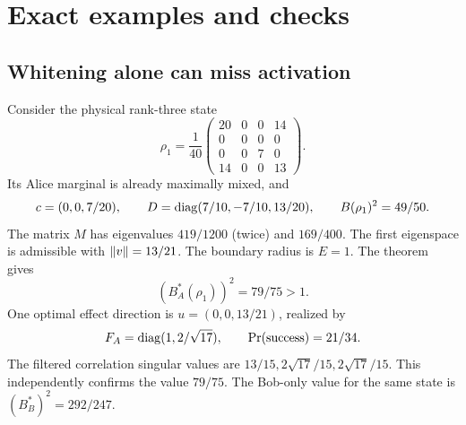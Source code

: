 \section{Exact examples and checks}

\subsection{Whitening alone can miss activation}
Consider the physical rank-three state
\begin{equation}
 \rho_1=\frac1{40}\begin{pmatrix}
 20&0&0&14\\0&0&0&0\\0&0&7&0\\14&0&0&13
 \end{pmatrix}.
\end{equation}
Its Alice marginal is already maximally mixed, and
\begin{equation}
 c=(0,0,7/20),\qquad D=\operatorname{diag}(7/10,-7/10,13/20),\qquad B(\rho_1)^2=49/50.
\end{equation}
The matrix $M$ has eigenvalues $419/1200$ (twice) and $169/400$. The first eigenspace is admissible with $\left\lVert v\right\rVert=13/21$. The boundary radius is $E=1$. The theorem gives
\begin{equation}
 \boxed{(B_A^*(\rho_1))^2=79/75>1.}
\end{equation}
One optimal effect direction is $u=(0,0,13/21)$, realized by
\begin{equation}
 F_A=\operatorname{diag}(1,2/\sqrt{17}),\qquad \Pr(\text{success})=21/34.
\end{equation}
The filtered correlation singular values are $13/15,2\sqrt{17}/15,2\sqrt{17}/15$. This independently confirms the value $79/75$. The Bob-only value for the same state is $(B_B^*)^2=292/247$.

